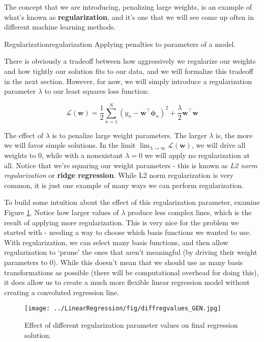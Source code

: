 The concept that we are introducing, penalizing large weights, is an example of what's known as \textbf{regularization}, and it's one that we will see come up often in different machine learning methods.

\begin{definition}{Regularization}{regularization}
    Applying penalties to parameters of a model.
\end{definition}

There is obviously a tradeoff between how aggressively we regularize our weights and how tightly our solution fits to our data, and we will formalize this tradeoff in the next section. However, for now, we will simply introduce a regularization parameter $\lambda$ to our least squares loss function:

\begin{equation} \label{least-squares-loss-fn-w-regularization}
    \mathcal{L}(\textbf{w}) = \frac{1}{2} \sum_{n=1}^{N} (y_{n} - \textbf{w}^\top\boldsymbol{\phi}_{n})^2 + \frac{\lambda}{2}\textbf{w}^{\top}\textbf{w}
\end{equation}

The effect of $\lambda$ is to penalize large weight parameters. The larger $\lambda$ is, the more we will favor simple solutions. In the limit $\lim_{\lambda\to\infty} \mathcal{L}(\textbf{w})$, we will drive all weights to 0, while with a nonexistant $\lambda = 0$ we will apply no regularization at all. Notice that we're squaring our weight parameters - this is known as \textit{L2 norm regularization} or \textbf{ridge regression}. While L2 norm regularization is very common, it is just one example of many ways we can perform regularization.

To build some intuition about the effect of this regularization parameter, examine Figure \ref{fig:ridge-reg-diff-values}. Notice how larger values of $\lambda$ produce less complex lines, which is the result of applying more regularization. This is very nice for the problem we started with - needing a way to choose which basis functions we wanted to use. With regularization, we can select many basis functions, and then allow regularization to `prune' the ones that aren't meaningful (by driving their weight parameters to 0). While this doesn't mean that we should use as many basis transformations as possible (there will be computational overhead for doing this), it does allow us to create a much more flexible linear regression model without creating a convoluted regression line.

\begin{figure}
    \centering
    \texttt{[image: ../LinearRegression/fig/diffregvalues\_GEN.jpg]}
    \caption{Effect of different regularization parameter values on final regression solution.}
    \label{fig:ridge-reg-diff-values}
\end{figure}


